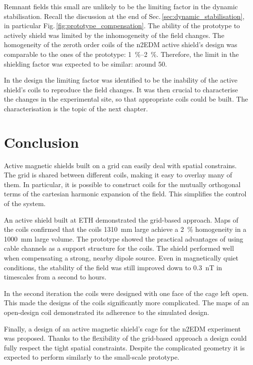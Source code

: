 Remnant fields this small are unlikely to be the limiting factor in the dynamic stabilisation. Recall the discussion at the end of Sec.\,\ref{sec:dynamic_stabilisation}, in particular Fig.\,\ref{fig:prototype_compensation}. The ability of the prototype to actively shield was limited by the inhomogeneity of the field changes. The homogeneity of the zeroth order coils of the n2EDM active shield's design was comparable to the ones of the prototype: \SIrange[range-phrase=--,range-units=single]{1}{2}{\percent}. Therefore, the limit in the shielding factor was expected to be similar: around 50.

In the design the limiting factor was identified to be the inability of the active shield's coils to reproduce the field changes. It was then crucial to characterise the changes in the experimental site, so that appropriate coils could be built. The characterisation is the topic of the next chapter.




\section{Conclusion}
Active magnetic shields built on a grid can easily deal with spatial constrains. The grid is shared between different coils, making it easy to overlay many of them. In particular, it is possible to construct coils for the mutually orthogonal terms of the cartesian harmonic expansion of the field. This simplifies the control of the system.

An active shield built at ETH demonstrated the grid-based approach. Maps of the coils confirmed that the coils \SI{1310}{\milli\metre} large achieve a \SI{2}{\percent} homogeneity in a \SI{1000}{\milli\metre} large volume. The prototype showed the practical advantages of using cable channels as a support structure for the coils. The shield performed well when compensating a strong, nearby dipole source. Even in magnetically quiet conditions, the stability of the field was still improved down to \SI{0.3}{\nano\tesla} in timescales from a second to hours.

In the second iteration the coils were designed with one face of the cage left open. This made the designs of the coils significantly more complicated. The maps of an open-design coil demonstrated its adherence to the simulated design.

Finally, a design of an active magnetic shield's cage for the n2EDM experiment was proposed. Thanks to the flexibility of the grid-based approach a design could fully respect the tight spatial constraints. Despite the complicated geometry it is expected to perform similarly to the small-scale prototype.

